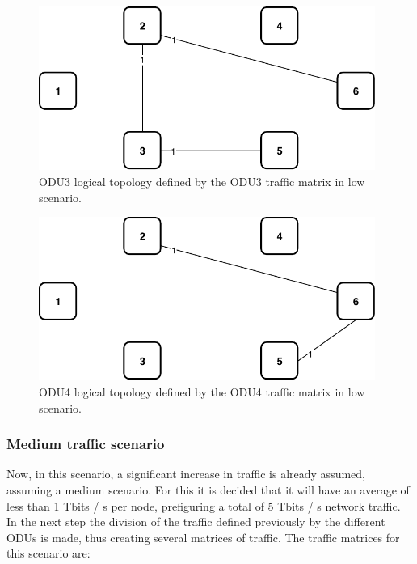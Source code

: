 \vspace{13pt}
\begin{figure}[h!]
\centering
\includegraphics[width=11cm]{sdf/ilp/opaque_survivability/figures/logical_topology_ODU3_low}
\caption{ODU3 logical topology defined by the ODU3 traffic matrix in low scenario.}
\label{logical_ODU3_low}
\end{figure}
\newpage
\begin{figure}[h!]
\centering
\includegraphics[width=11cm]{sdf/ilp/opaque_survivability/figures/logical_topology_ODU4_low}
\caption{ODU4 logical topology defined by the ODU4 traffic matrix in low scenario.}
\label{logical_ODU4_low}
\end{figure}

\subsubsection{Medium traffic scenario}\label{medium_traffic_scenario}

Now, in this scenario, a significant increase in traffic is already assumed, assuming a medium scenario. For this it is decided that it will have an average of less than 1 Tbits / s per node, prefiguring a total of 5 Tbits / s network traffic.
In the next step the division of the traffic defined previously by the different ODUs is made, thus creating several matrices of traffic.
The traffic matrices for this scenario are:

